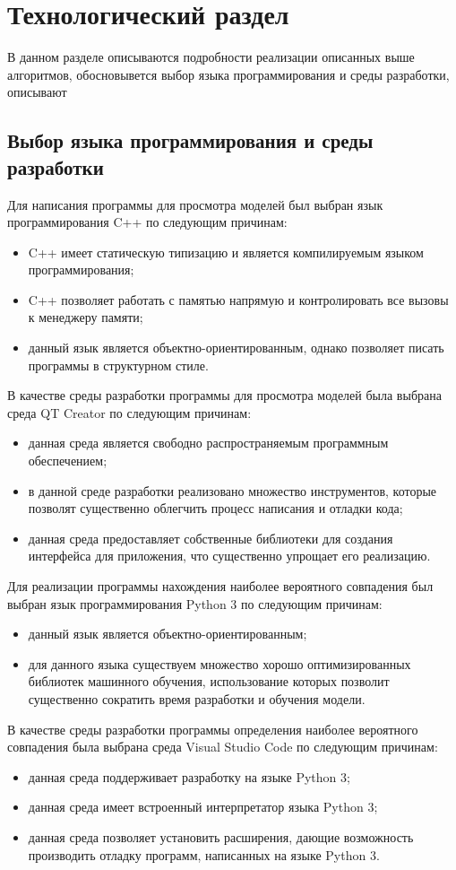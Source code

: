 \chapter{Технологический раздел}
В данном разделе описываются подробности реализации описанных выше алгоритмов, обосновывется выбор языка программирования и среды разработки, описывают
\section{Выбор языка программирования и среды разработки}
Для написания программы для просмотра моделей был выбран язык программирования C++ по следующим причинам:
\begin{itemize}
\item C++ имеет статическую типизацию и является компилируемым языком программирования;
\item C++ позволяет работать с памятью напрямую и контролировать все вызовы к менеджеру памяти;
\item данный язык является объектно-ориентированным, однако позволяет писать программы в структурном стиле.
\end{itemize}

В качестве среды разработки программы для просмотра моделей была выбрана среда QT Creator по следующим причинам:
\begin{itemize}
\item данная среда является свободно распространяемым программным обеспечением;
\item в данной среде разработки реализовано множество инструментов, которые позволят существенно облегчить процесс написания и отладки кода;
\item данная среда предоставляет собственные библиотеки для создания интерфейса для приложения, что существенно упрощает его реализацию.
\end{itemize}

Для реализации программы нахождения наиболее вероятного совпадения был выбран язык программирования Python 3 по следующим причинам:
\begin{itemize}
\item данный язык является объектно-ориентированным;
\item для данного языка существуем множество хорошо оптимизированных библиотек машинного обучения, использование которых позволит существенно сократить время разработки и обучения модели.
\end{itemize}

В качестве среды разработки программы определения наиболее вероятного совпадения была выбрана среда Visual Studio Code по следующим причинам:
\begin{itemize}
\item данная среда поддерживает разработку на языке Python 3;
\item данная среда имеет встроенный интерпретатор языка Python 3;
\item данная среда позволяет установить расширения, дающие возможность производить отладку программ, написанных на языке Python 3.
\end{itemize}

